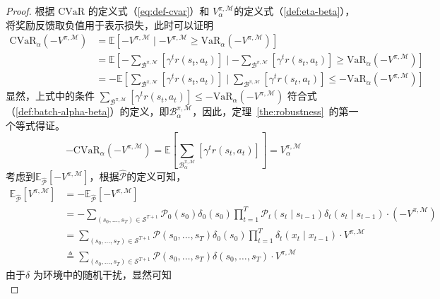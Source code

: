 \begin{proof}
根据 $\mathrm{CVaR}$ 的定义式（\ref{eq:def-cvar}）和 $V_\alpha^{\pi,\mathcal{M}}$的定义式（\ref{def:eta-beta}），将奖励反馈取负值用于表示损失，此时可以证明
\begin{align}
\mathrm{CVaR}_\alpha(-V^{\pi,\mathcal{M}}) &= \mathbb{E}\left[-V^{\pi,\mathcal{M}}\mid -V^{\pi,\mathcal{M}} \geq \mathrm{VaR}_\alpha(-V^{\pi,\mathcal{M}})\right]\\
&=\mathbb{E}\left[-{\sum}_{\mathcal{B}^{\pi,\mathcal{M}}}\left[\gamma^t r(s_t,a_t)\right]\mid -{\sum}_{\mathcal{B}^{\pi,\mathcal{M}}}\left[\gamma^t r(s_t,a_t)\right] \geq \mathrm{VaR}_\alpha(-V^{\pi,\mathcal{M}})\right]\\
&=-\mathbb{E}\left[{\sum}_{\mathcal{B}^{\pi,\mathcal{M}}}\left[\gamma^t r(s_t,a_t)\right]\mid {\sum}_{\mathcal{B}^{\pi,\mathcal{M}}}\left[\gamma^t r(s_t,a_t)\right] \leq -\mathrm{VaR}_\alpha(-V^{\pi,\mathcal{M}})\right]
\end{align}
显然，上式中的条件 ${\sum}_{\mathcal{B}^{\pi,\mathcal{M}}}\left[\gamma^t r(s_t,a_t)\right] \leq -\mathrm{VaR}_\alpha(-V^{\pi,\mathcal{M}})$ 符合式（\ref{def:batch-alpha-beta}）的定义，即$\mathcal{B}_\alpha^{\pi,\mathcal{M}}$，因此，定理~\ref{the:robustness}~的第一个等式得证。
\begin{equation}
-\mathrm{CVaR}_\alpha(-V^{\pi,\mathcal{M}}) = \mathbb{E}\left[{\sum}_{\mathcal{B}_\alpha^{\pi,\mathcal{M}}}\left[\gamma^t r(s_t,a_t)\right]\right] = V_\alpha^{\pi,\mathcal{M}}
\end{equation}
考虑到$\mathbb{E}_{\hat{\mathcal{P}}}[-V^{\pi,\mathcal{M}}]$，根据$\hat{\mathcal{P}}$的定义可知，
\begin{align}
    \mathbb{E}_{\hat{\mathcal{P}}}[V^{\pi,\mathcal{M}}] &= -\mathbb{E}_{\hat{\mathcal{P}}}[-V^{\pi,\mathcal{M}}]\\
    &= -\sum_{(s_0,\ldots,s_T)\in\mathcal{S}^{T+1}}\mathcal{P}_0(s_0)\delta_0(s_0)\prod_{t=1}^{T}\mathcal{P}_t(s_t\mid s_{t-1})\delta_t(s_t\mid s_{t-1})\cdot (-V^{\pi,\mathcal{M}})\\
    &= \sum_{(s_0,\ldots,s_T)\in\mathcal{S}^{T+1}}\mathcal{P}(s_0,\ldots,s_T)\delta_0(s_0)\prod_{t=1}^{T}\delta_t(x_t\mid x_{t-1})\cdot V^{\pi,\mathcal{M}}\\
    &\triangleq \sum_{(s_0,\ldots,s_T)\in\mathcal{S}^{T+1}}\mathcal{P}(s_0,\ldots,s_T)\delta(s_0,\ldots,s_T)\cdot V^{\pi,\mathcal{M}}
\end{align}
由于$\delta$ 为环境中的随机干扰，显然可知
\begin{equation}\label{eq:delta-exp}

\end{equation}
\end{proof}
